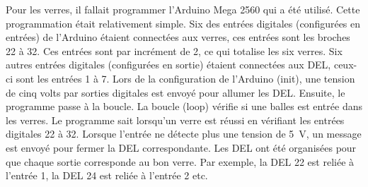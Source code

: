 

Pour les verres, il fallait programmer l'Arduino Mega 2560 qui a été utilisé.
Cette programmation était relativement simple.
Six des entrées digitales (configurées en entrées) de l'Arduino étaient connectées aux verres, ces entrées sont les broches 22 à 32.
Ces entrées sont par incrément de 2, ce qui totalise les six verres.
Six autres entrées digitales (configurées en sortie) étaient connectées aux DEL, ceux-ci sont les entrées 1 à 7.
Lors de la configuration de l'Arduino (init), une tension de cinq volts par sorties digitales est envoyé pour allumer les DEL.
Ensuite, le programme passe à la boucle.
La boucle (loop) vérifie si une balles est entrée dans les verres.
Le programme sait lorsqu'un verre est réussi en vérifiant les entrées digitales 22 à 32.
Lorsque l'entrée ne détecte plus une tension de 5~V, un message est envoyé pour fermer la DEL correspondante.
Les DEL ont été organisées pour que chaque sortie corresponde au bon verre.
Par exemple, la DEL 22 est reliée à l’entrée 1, la DEL 24 est reliée à l’entrée 2 etc.
